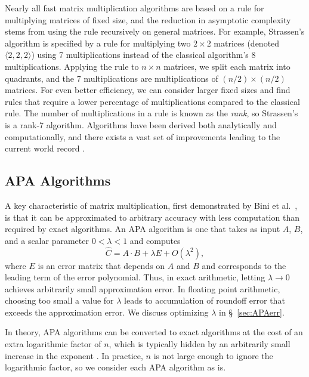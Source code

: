 \documentclass[manuscript]{acmart}
\newcommand{\dims}[1]{\langle #1 \rangle}
\begin{document}
Nearly all fast matrix multiplication algorithms are based on a rule for multiplying matrices of fixed size, and the reduction in asymptotic complexity stems from using the rule recursively on general matrices.
For example, Strassen's algorithm is specified by a rule for multiplying two $2\times2$ matrices (denoted $\dims{2,2,2}$) using 7 multiplications instead of the classical algorithm's 8 multiplications.
Applying the rule to $n\times n$ matrices, we split each matrix into quadrants, and the 7 multiplications are multiplications of $(n/2)\times (n/2)$ matrices.
For even better efficiency, we can consider larger fixed sizes and find rules that require a lower percentage of multiplications compared to the classical rule.
The number of multiplications in a rule is known as the \emph{rank}, so Strassen's is a rank-7 algorithm.
Algorithms have been derived both analytically and computationally, and there exists a vast set of improvements leading to the current world record \cite{Pan84,CW87,Williams12,AW21}.

\subsection{APA Algorithms}
\label{sec:APAalgs}

A key characteristic of matrix multiplication, first demonstrated by Bini et al.~\cite{BCRL79}, is that it can be approximated to arbitrary accuracy with less computation than required by exact algorithms.
An APA algorithm is one that takes as input $A$, $B$, and a scalar parameter $0<\lambda<1$ and computes 
\begin{equation}
\label{eq:APAapprox}
\hat C = A\cdot B + \lambda E + O(\lambda^2),
\end{equation}
where $E$ is an error matrix that depends on $A$ and $B$ and corresponds to the leading term of the error polynomial.
Thus, in exact arithmetic, letting $\lambda \rightarrow 0$ achieves arbitrarily small approximation error.
In floating point arithmetic, choosing too small a value for $\lambda$ leads to accumulation of roundoff error that exceeds the approximation error.
We discuss optimizing $\lambda$ in \S~\ref{sec:APAerr}.

In theory, APA algorithms can be converted to exact algorithms at the cost of an extra logarithmic factor of $n$, which is typically hidden by an arbitrarily small increase in the exponent \cite{Bini80}.
In practice, $n$ is not large enough to ignore the logarithmic factor, so we consider each APA algorithm as is.
\end{document}

